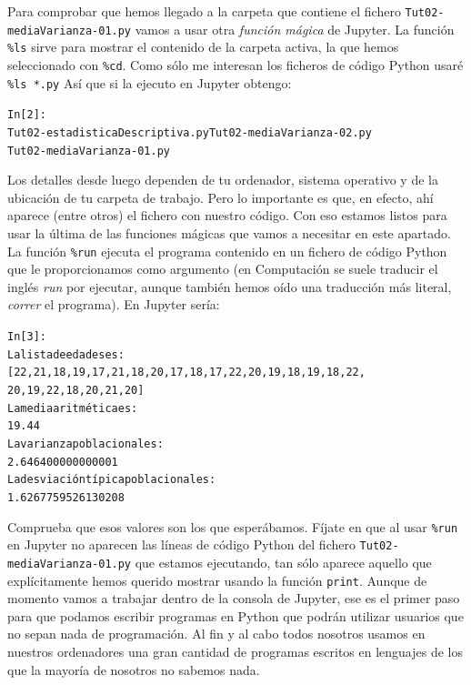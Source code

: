 \documentclass[10pt,a4paper]{article}\usepackage[]{graphicx}\usepackage[]{color}
\makeatletter
\newenvironment{kframe}{%
 \def\at@end@of@kframe{}%
 \ifinner\ifhmode%
  \def\at@end@of@kframe{\end{minipage}}%
  \begin{minipage}{\columnwidth}%
 \fi\fi%
 \def\FrameCommand##1{\hskip\@totalleftmargin \hskip-\fboxsep
 \colorbox{shadecolor}{##1}\hskip-\fboxsep
     \hskip-\linewidth \hskip-\@totalleftmargin \hskip\columnwidth}%
 \MakeFramed {\advance\hsize-\width
   \@totalleftmargin\z@ \linewidth\hsize
   \@setminipage}}%
 {\par\unskip\endMakeFramed%
 \at@end@of@kframe}
\newenvironment{knitrout}{}{} %
\newcounter {cont01}
\makeatother
\begin{document}
Para comprobar que hemos llegado a la carpeta que contiene el fichero {\tt Tut02-mediaVarianza-01.py} vamos a usar otra {\em función mágica} de Jupyter. La función \verb#%ls#
sirve para mostrar el contenido de la carpeta activa, la que hemos seleccionado con \verb#%cd#.
Como sólo me interesan los ficheros de código Python usaré \verb#%ls *.py#
Así que si la ejecuto en Jupyter obtengo:

\begin{knitrout}
\color{fgcolor}\begin{kframe}
\begin{alltt}
In [2]: %
Tut02-estadisticaDescriptiva.py  Tut02-mediaVarianza-02.py
Tut02-mediaVarianza-01.py
\end{alltt}
\end{kframe}
\end{knitrout}
Los detalles desde luego dependen de tu ordenador, sistema operativo y de la ubicación de tu carpeta de trabajo. Pero lo importante es que, en efecto, ahí aparece (entre otros) el fichero con nuestro código. Con eso estamos listos para usar la última de las funciones mágicas que vamos a necesitar en este apartado. La función \verb#%run#
ejecuta el programa contenido en un fichero de código Python que le proporcionamos como argumento (en Computación se suele traducir el inglés {\em run} por ejecutar, aunque también hemos oído una traducción más literal, {\em correr} el programa). En Jupyter sería:
\begin{knitrout}
\color{fgcolor}\begin{kframe}
\begin{alltt}
In [3]: %
La lista de edades es:
[22, 21, 18, 19, 17, 21, 18, 20, 17, 18, 17, 22, 20, 19, 18, 19, 18, 22,
 20, 19, 22, 18, 20, 21, 20]
La media aritmética es:
19.44
La varianza poblacional es:
2.646400000000001
La desviación típica poblacional es:
1.6267759526130208
\end{alltt}
\end{kframe}
\end{knitrout}
Comprueba que esos valores son los que esperábamos. Fíjate en que al usar \verb#%run#
en Jupyter no aparecen las líneas de código Python del fichero {\tt Tut02-mediaVarianza-01.py} que estamos ejecutando, tan sólo aparece aquello que explícitamente hemos querido mostrar usando la función {\tt print}. Aunque de momento vamos a trabajar dentro de la consola de Jupyter, ese es el primer paso para que podamos escribir programas en Python que podrán utilizar usuarios que no sepan nada de programación. Al fin y al cabo todos nosotros usamos en nuestros ordenadores una gran cantidad de programas escritos en lenguajes de los que la mayoría de nosotros no sabemos nada.
\end{document}
